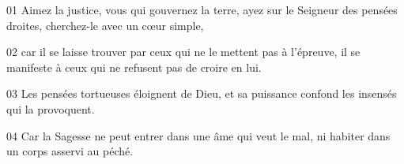01 Aimez la justice, vous qui gouvernez la terre, ayez sur le Seigneur des pensées droites, cherchez-le avec un cœur simple,

02 car il se laisse trouver par ceux qui ne le mettent pas à l’épreuve, il se manifeste à ceux qui ne refusent pas de croire en lui.

03 Les pensées tortueuses éloignent de Dieu, et sa puissance confond les insensés qui la provoquent.

04 Car la Sagesse ne peut entrer dans une âme qui veut le mal, ni habiter dans un corps asservi au péché.
